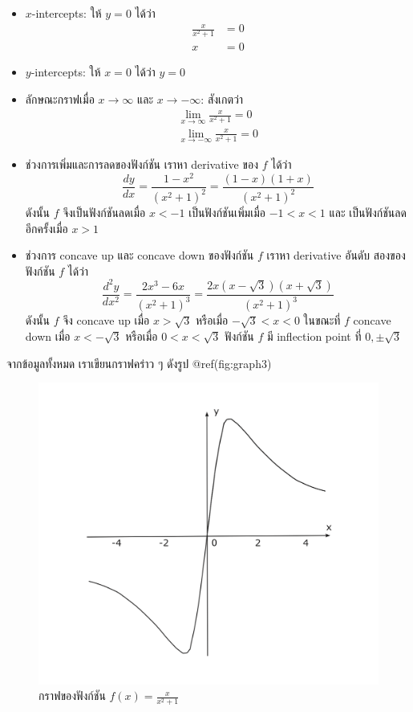 \documentclass[
]{book}
\begin{document}
\begin{itemize}
\item
  \(x\)-intercepts: ให้ \(y=0\) ได้ว่า \begin{equation}   \begin{aligned}
      \frac{x}{x^2+1} &= 0 \\
      x &= 0
    \end{aligned} \end{equation}
\item
  \(y\)-intercepts: ให้ \(x=0\) ได้ว่า \(y=0\)
\item
  ลักษณะกราฟเมื่อ \(x \to \infty\) และ \(x \to -\infty\): สังเกตว่า
  \begin{equation}   \begin{aligned}
      \lim_{x\to \infty} \frac{x}{x^2+1} = 0 \\
      \lim_{x\to -\infty} \frac{x}{x^2+1} = 0
    \end{aligned} \end{equation}
\item
  ช่วงการเพิ่มและการลดของฟังก์ชัน เราหา derivative ของ \(f\) ได้ว่า
  \[\frac{dy}{dx} = \frac{1-x^2}{(x^2+1)^2}  =\frac{(1-x)(1+x)}{(x^2+1)^2}\]
  ดังนั้น \(f\) จึงเป็นฟังก์ชันลดเมื่อ \(x < -1\) เป็นฟังก์ชันเพิ่มเมื่อ \(-1 < x < 1\)
  และ เป็นฟังก์ชันลดอีกครั้งเมื่อ \(x>1\)
\item
  ช่วงการ concave up และ concave down ของฟังก์ชัน \(f\) เราหา derivative
  อันดับ สองของฟังก์ชัน \(f\) ได้ว่า
  \[\frac{d^2y}{dx^2} = \frac{2x^3-6x}{(x^2+1)^3} = \frac{2x(x-\sqrt{3})(x+\sqrt{3})}{(x^2+1)^3}\]
  ดังนั้น \(f\) จึง concave up เมื่อ \(x>\sqrt{3}\) หรือเมื่อ \(-\sqrt{3}<x<0\)
  ในขณะที่ \(f\) concave down เมื่อ \(x<-\sqrt{3}\) หรือเมื่อ \(0<x<\sqrt{3}\)
  ฟังก์ชัน \(f\) มี inflection point ที่ \(0,\pm\sqrt{3}\)
\end{itemize}

จากข้อมูลทั้งหมด เราเขียนกราฟคร่าว ๆ ดังรูป @ref(fig:graph3)

\begin{figure}

{\centering \includegraphics[width=0.5\linewidth]{images/graph3} 

}

\caption{กราฟของฟังก์ชัน $f(x) = \frac{x}{x^2+1}$}\label{fig:graph3}
\end{figure}
\end{document}
